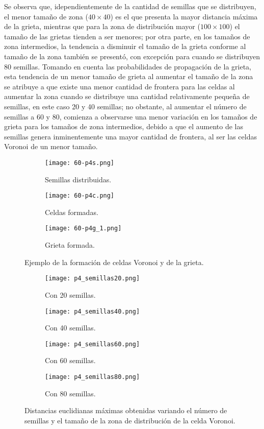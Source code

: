 \documentclass{article}
\begin{document}
Se observa que, idependientemente de la cantidad de semillas que se distribuyen, el menor tamaño de zona ($40\times40$) es el que presenta la mayor distancia máxima de la grieta, mientras que para la zona de distribución mayor ($100\times100$) el tamaño de las grietas tienden a ser menores; por otra parte, en los tamaños de zona intermedios, la tendencia a disminuir el tamaño de la grieta conforme al tamaño de la zona también se presentó, con excepción para cuando se distribuyen 80 semillas. Tomando en cuenta las probabilidades de propagación de la grieta, esta tendencia de un menor tamaño de grieta al aumentar el tamaño de la zona se atribuye a que existe una menor cantidad de frontera para las celdas al aumentar la zona cuando se distribuye una cantidad relativamente pequeña de semillas, en este caso 20 y 40 semillas; no obstante, al aumentar el número de semillas a 60 y 80, comienza a observarse una menor variación en los tamaños de grieta para los tamaños de zona intermedios, debido a que el aumento de las semillas genera inminentemente una mayor cantidad de frontera, al ser las celdas Voronoi de un menor tamaño.

\begin{figure}
\centering
\begin{subfigure}[b]{0.3\linewidth}
\texttt{[image: 60-p4s.png]}
\caption{Semillas distribuidas.}
\label{o}
\end{subfigure}
\begin{subfigure}[b]{0.3\linewidth}
\texttt{[image: 60-p4c.png]}
\caption{Celdas formadas.}
\label{s}
\end{subfigure}
\begin{subfigure}[b]{0.3\linewidth}
\texttt{[image: 60-p4g\_1.png]}
\caption{Grieta formada.}
\label{se}
\end{subfigure}
\caption{Ejemplo de la formación de celdas Voronoi y de la grieta.}
\label{celdas}
\end{figure}

\begin{figure}
\centering
\begin{subfigure}[b]{0.4\linewidth}
\texttt{[image: p4\_semillas20.png]}
\caption{Con 20 semillas.}
\label{s20}
\end{subfigure}
\begin{subfigure}[b]{0.4\linewidth}
\texttt{[image: p4\_semillas40.png]}
\caption{Con 40 semillas.}
\label{s40}
\end{subfigure}
\begin{subfigure}[b]{0.4\linewidth}
\texttt{[image: p4\_semillas60.png]}
\caption{Con 60 semillas.}
\label{s60}
\end{subfigure}
\begin{subfigure}[b]{0.4\linewidth}
\texttt{[image: p4\_semillas80.png]}
\caption{Con 80 semillas.}
\label{s80}
\end{subfigure}
\caption{Distancias euclidianas máximas obtenidas variando el número de semillas y el tamaño de la zona de distribución de la celda Voronoi.}
\label{distancia}
\end{figure}
\end{document}
